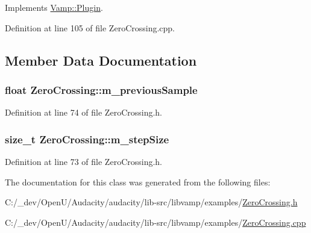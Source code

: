 Implements \hyperlink{class_vamp_1_1_plugin_aad67dc9d0052417511070c4ebcfbf24f}{Vamp\+::\+Plugin}.



Definition at line 105 of file Zero\+Crossing.\+cpp.



\subsection{Member Data Documentation}
\subsubsection[{\texorpdfstring{m\+\_\+previous\+Sample}{m_previousSample}}]{\setlength{\rightskip}{0pt plus 5cm}float Zero\+Crossing\+::m\+\_\+previous\+Sample\hspace{0.3cm}{\ttfamily [protected]}}\hypertarget{class_zero_crossing_a0f2d9f2cab0a8a30344e1f2c0ebb8ee8}{}\label{class_zero_crossing_a0f2d9f2cab0a8a30344e1f2c0ebb8ee8}


Definition at line 74 of file Zero\+Crossing.\+h.

\subsubsection[{\texorpdfstring{m\+\_\+step\+Size}{m_stepSize}}]{\setlength{\rightskip}{0pt plus 5cm}size\+\_\+t Zero\+Crossing\+::m\+\_\+step\+Size\hspace{0.3cm}{\ttfamily [protected]}}\hypertarget{class_zero_crossing_a584f100b87c78f9af9da040d79567d52}{}\label{class_zero_crossing_a584f100b87c78f9af9da040d79567d52}


Definition at line 73 of file Zero\+Crossing.\+h.



The documentation for this class was generated from the following files\+:\begin{DoxyCompactItemize}
\item 
C\+:/\+\_\+dev/\+Open\+U/\+Audacity/audacity/lib-\/src/libvamp/examples/\hyperlink{_zero_crossing_8h}{Zero\+Crossing.\+h}\item 
C\+:/\+\_\+dev/\+Open\+U/\+Audacity/audacity/lib-\/src/libvamp/examples/\hyperlink{_zero_crossing_8cpp}{Zero\+Crossing.\+cpp}\end{DoxyCompactItemize}

